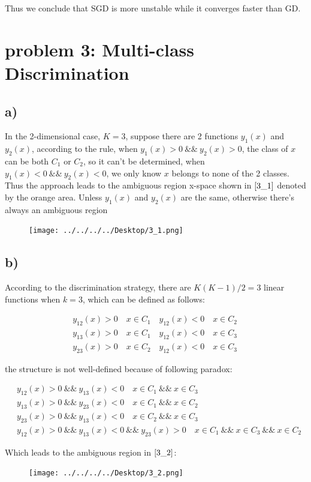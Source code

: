 \documentclass[a4paper,12pt]{article}
\begin{document}
Thus we conclude that SGD is more unstable while it converges faster than GD.

\section{problem 3: Multi-class Discrimination}

\subsection{a)}

In the 2-dimensional case, $K = 3$, suppose there are 2 functions $y_1(x)$ and $y_2(x)$, according to the rule, when $y_1(x)>0 \  \&\& \  y_2(x)>0$, the class of $x$ can be both $C_1$ or $C_2$, so it can't be determined, when $y_1(x)<0  \ \&\& \  y_2(x)<0$, we only know $x$ belongs to none of the 2 classes. Thus the approach leads to the ambiguous region x-space shown in $\ref{3_1}$ denoted by the orange area. Unless $y_1(x)$ and $y_2(x)$ are the same, otherwise there's always an ambiguous region

\begin{figure}[htbp]
\centering
\texttt{[image: ../../../../Desktop/3\_1.png]}
\caption{}
\label{3_1}
\end{figure}

\subsection{b)}

According to the discrimination strategy, there are $K(K-1)/2 = 3$ linear functions when $k = 3$, which can be defined as follows:

\begin{align}
&y_{12}(x) > 0 \quad x \in C_1 \quad y_{12}(x) < 0 \quad x \in C_2 \quad \nonumber \\
&y_{13}(x) > 0 \quad x \in C_1 \quad y_{12}(x) < 0 \quad x \in C_3 \quad \nonumber \\
&y_{23}(x) > 0 \quad x \in C_2 \quad y_{12}(x) < 0 \quad x \in C_3 \quad \nonumber 
\end{align}

the structure is not well-defined because of following paradox:

\begin{align}
&y_{12}(x) > 0 \ \&\& \ y_{13}(x) < 0  \quad x \in C_1 \ \&\& \ x\in C_3  \nonumber \\
&y_{13}(x) > 0 \ \&\& \ y_{23}(x) < 0  \quad x \in C_1 \ \&\& \ x\in C_2 \nonumber \\
&y_{23}(x) > 0 \ \&\& \ y_{13}(x) < 0 \quad x \in C_2 \ \&\& \ x\in C_3  \nonumber \\
&y_{12}(x) > 0 \ \&\& \ y_{13}(x) < 0  \ \&\& \ y_{23}(x) > 0 \quad x \in C_1 \ \&\& \ x\in C_3 \ \&\&\ x\in C_2  \nonumber 
\end{align}

Which leads to the ambiguous region in $\ref{3_2}$:

\begin{figure}[htbp]
\centering
\texttt{[image: ../../../../Desktop/3\_2.png]}
\caption{}
\label{3_2}
\end{figure}
\end{document}
